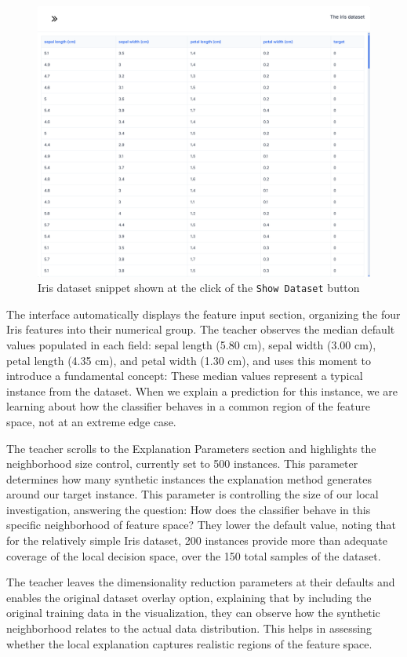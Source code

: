\begin{figure}[h]
    \centering
    \includegraphics[width=0.7\linewidth]{images/showDatasetIris.png}
    \caption{Iris dataset snippet shown at the click of the \texttt{Show Dataset} button}
    \label{fig:showDatasetIris}
\end{figure}

The interface automatically displays the feature input section, organizing the four Iris features into their numerical group. The teacher observes the median default values populated in each field: sepal length (5.80 cm), sepal width (3.00 cm), petal length (4.35 cm), and petal width (1.30 cm), and uses this moment to introduce a fundamental concept: These median values represent a typical instance from the dataset. When we explain a prediction for this instance, we are learning about how the classifier behaves in a common region of the feature space, not at an extreme edge case.

The teacher scrolls to the Explanation Parameters section and highlights the neighborhood size control, currently set to 500 instances. This parameter determines how many synthetic instances the explanation method generates around our target instance. This parameter is controlling the size of our local investigation, answering the question: How does the classifier behave in this specific neighborhood of feature space? They lower the default value, noting that for the relatively simple Iris dataset, 200 instances provide more than adequate coverage of the local decision space, over the 150 total samples of the dataset.

The teacher leaves the dimensionality reduction parameters at their defaults and enables the original dataset overlay option, explaining that by including the original training data in the visualization, they can observe how the synthetic neighborhood relates to the actual data distribution. This helps in assessing whether the local explanation captures realistic regions of the feature space.

